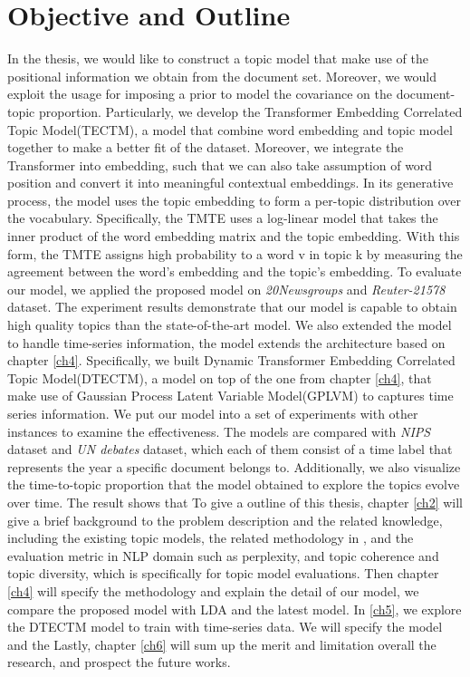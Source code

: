 \section{Objective and Outline}\label{ch1:4}
In the thesis, we would like to construct a topic model that make use of the positional information we obtain from the document set. Moreover, we would exploit the usage for imposing a prior to model the covariance on the document-topic proportion.
Particularly, we develop the Transformer Embedding Correlated Topic Model(TECTM), a model that combine word embedding and topic model together to make a better fit of the dataset. Moreover, we integrate the Transformer into embedding, such that we can also take assumption of word position and convert it into meaningful contextual embeddings.
In its generative process, the model uses the topic embedding to form a per-topic distribution over the vocabulary. Specifically, the TMTE uses a log-linear model that takes the inner product of the word embedding matrix and the topic embedding.
With this form, the TMTE assigns high probability to a word v in topic k by measuring the agreement between the word’s embedding and the topic’s embedding.
To evaluate our model, we applied the proposed model on \textit{20Newsgroups} and \textit{Reuter-21578} dataset. The experiment results demonstrate that our model is capable to obtain high quality topics than the state-of-the-art model. 
We also extended the model to handle time-series information, the model extends the architecture based on chapter \ref{ch4}.
Specifically, we built Dynamic Transformer Embedding Correlated Topic Model(DTECTM), a model on top of the one from chapter \ref{ch4}, that make use of Gaussian Process Latent Variable Model(GPLVM) to captures time series information. 
We put our model into a set of experiments with other instances to examine the effectiveness. The models are compared with \textit{NIPS} dataset and \textit{UN debates} dataset, which each of them consist of a time label that represents the year a specific document belongs to.
Additionally, we also visualize the time-to-topic proportion that the model obtained to explore the topics evolve over time. 
The result shows that 
To give a outline of this thesis, chapter \ref{ch2} will give a brief background to the problem description and the related knowledge, including the existing topic models, the related methodology in  , and the evaluation metric in NLP domain such as perplexity, and topic coherence and topic diversity, which is specifically for topic model evaluations.
Then chapter \ref{ch4} will specify the methodology and explain the detail of our model, we compare the proposed model with LDA and the latest model. 
In \ref{ch5}, we explore the DTECTM model to train with time-series data. We will specify the model and the 
Lastly, chapter \ref{ch6} will sum up the merit and limitation overall the research, and prospect the future works.